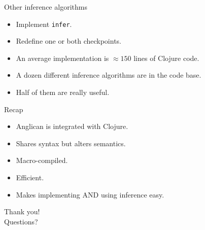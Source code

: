 \documentclass{beamer}
\begin{document}
\begin{frame}{Other inference algorithms}
    \begin{itemize}
        \item Implement \texttt{infer}.
        \item Redefine one or both checkpoints.
        \item An average implementation is $\approx 150$ lines of Clojure
            code.
        \item A dozen different inference algorithms are in the
            code base.
        \item Half of them are really useful.
    \end{itemize}
\end{frame}

\begin{frame}{Recap}
    \begin{itemize}
        \item Anglican is integrated with Clojure.
        \item Shares syntax but alters semantics.
        \item Macro-compiled.
        \item Efficient.
        \item Makes implementing AND using inference easy.
    \end{itemize}
\end{frame}

\begin{frame}
    \LARGE
    \center
    Thank you!\\Questions?
\end{frame}
\end{document}
